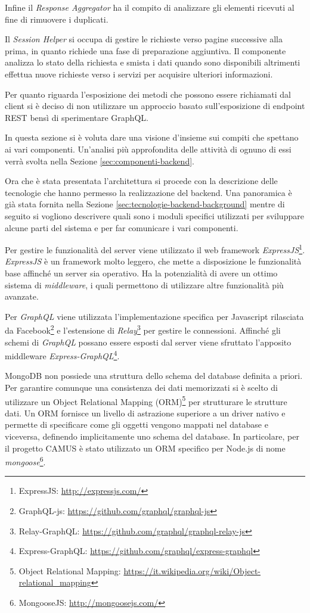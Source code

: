 Infine il \emph{Response Aggregator} ha il compito di analizzare gli elementi ricevuti al fine di rimuovere i duplicati.

Il \emph{Session Helper} si occupa di gestire le richieste verso pagine successive alla prima, in quanto richiede una fase di preparazione aggiuntiva. Il componente analizza lo stato della richiesta e smista i dati quando sono disponibili altrimenti effettua nuove richieste verso i servizi per acquisire ulteriori informazioni.

Per quanto riguarda l'esposizione dei metodi che possono essere richiamati dal client si è deciso di non utilizzare un approccio basato sull'esposizione di endpoint REST bensì di sperimentare GraphQL.

In questa sezione si è voluta dare una visione d'insieme sui compiti che spettano ai vari componenti. Un'analisi più approfondita delle attività di ognuno di essi verrà svolta nella Sezione \ref{sec:componenti-backend}.

Ora che è stata presentata l'architettura si procede con la descrizione delle tecnologie che hanno permesso la realizzazione del backend. Una panoramica è già stata fornita nella Sezione \ref{sec:tecnologie-backend-background} mentre di seguito si vogliono descrivere quali sono i moduli specifici utilizzati per sviluppare alcune parti del sistema e per far comunicare i vari componenti.

Per gestire le funzionalità del server viene utilizzato il web framework \emph{ExpressJS}\footnote{ExpressJS: \url{http://expressjs.com/}}. \emph{ExpressJS} è un framework molto leggero, che mette a disposizione le funzionalità base affinché un server sia operativo. Ha la potenzialità di avere un ottimo sistema di \emph{middleware}, i quali permettono di utilizzare altre funzionalità più avanzate.

Per \emph{GraphQL} viene utilizzata l'implementazione specifica per Javascript rilasciata da Facebook\footnote{GraphQL-js: \url{https://github.com/graphql/graphql-js}} e l'estensione di \emph{Relay}\footnote{Relay-GraphQL: \url{https://github.com/graphql/graphql-relay-js}} per gestire le connessioni. Affinché gli schemi di \emph{GraphQL} possano essere esposti dal server viene sfruttato l'apposito middleware \emph{Express-GraphQL}\footnote{Express-GraphQL: \url{https://github.com/graphql/express-graphql}}.

MongoDB non possiede una struttura dello schema del database definita a priori. Per garantire comunque una consistenza dei dati memorizzati si è scelto di utilizzare un Object Relational Mapping (ORM)\footnote{Object Relational Mapping: \url{https://it.wikipedia.org/wiki/Object-relational_mapping}} per strutturare le strutture dati. Un ORM fornisce un livello di astrazione superiore a un driver nativo e permette di specificare come gli oggetti vengono mappati nel database e viceversa, definendo implicitamente uno schema del database. In particolare, per il progetto CAMUS è stato utilizzato un ORM specifico per Node.js di nome \emph{mongoose}\footnote{MongooseJS: \url{http://mongoosejs.com/}}.

